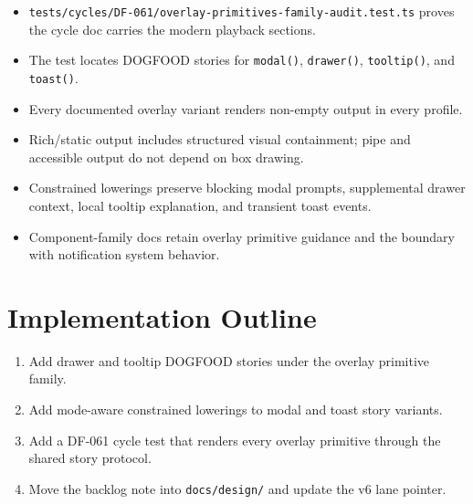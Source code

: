 \begin{itemize}
\tightlist
\item
  \texttt{t\allowbreak{}e\allowbreak{}s\allowbreak{}t\allowbreak{}s\allowbreak{}/\allowbreak{}c\allowbreak{}y\allowbreak{}c\allowbreak{}l\allowbreak{}e\allowbreak{}s\allowbreak{}/\allowbreak{}D\allowbreak{}F\allowbreak{}-\allowbreak{}0\allowbreak{}6\allowbreak{}1\allowbreak{}/\allowbreak{}o\allowbreak{}v\allowbreak{}e\allowbreak{}r\allowbreak{}l\allowbreak{}a\allowbreak{}y\allowbreak{}-\allowbreak{}p\allowbreak{}r\allowbreak{}i\allowbreak{}m\allowbreak{}i\allowbreak{}t\allowbreak{}i\allowbreak{}v\allowbreak{}e\allowbreak{}s\allowbreak{}-\allowbreak{}f\allowbreak{}a\allowbreak{}m\allowbreak{}i\allowbreak{}l\allowbreak{}y\allowbreak{}-\allowbreak{}a\allowbreak{}u\allowbreak{}d\allowbreak{}i\allowbreak{}t\allowbreak{}.\allowbreak{}t\allowbreak{}e\allowbreak{}s\allowbreak{}t\allowbreak{}.\allowbreak{}t\allowbreak{}s} proves the cycle doc carries the modern playback sections.
\item
  The test locates DOGFOOD stories for \texttt{m\allowbreak{}o\allowbreak{}d\allowbreak{}a\allowbreak{}l\allowbreak{}(\allowbreak{})}, \texttt{d\allowbreak{}r\allowbreak{}a\allowbreak{}w\allowbreak{}e\allowbreak{}r\allowbreak{}(\allowbreak{})}, \texttt{t\allowbreak{}o\allowbreak{}o\allowbreak{}l\allowbreak{}t\allowbreak{}i\allowbreak{}p\allowbreak{}(\allowbreak{})}, and \texttt{t\allowbreak{}o\allowbreak{}a\allowbreak{}s\allowbreak{}t\allowbreak{}(\allowbreak{})}.
\item
  Every documented overlay variant renders non-empty output in every profile.
\item
  Rich/static output includes structured visual containment; pipe and accessible output do not depend on box drawing.
\item
  Constrained lowerings preserve blocking modal prompts, supplemental drawer context, local tooltip explanation, and transient toast events.
\item
  Component-family docs retain overlay primitive guidance and the boundary with notification system behavior.
\end{itemize}

\section{Implementation Outline}\label{record-102-implementation-outline}

\begin{enumerate}
\def\labelenumi{\arabic{enumi}.}
\tightlist
\item
  Add drawer and tooltip DOGFOOD stories under the overlay primitive family.
\item
  Add mode-aware constrained lowerings to modal and toast story variants.
\item
  Add a DF-061 cycle test that renders every overlay primitive through the shared story protocol.
\item
  Move the backlog note into \texttt{d\allowbreak{}o\allowbreak{}c\allowbreak{}s\allowbreak{}/\allowbreak{}d\allowbreak{}e\allowbreak{}s\allowbreak{}i\allowbreak{}g\allowbreak{}n\allowbreak{}/} and update the v6 lane pointer.
\end{enumerate}

